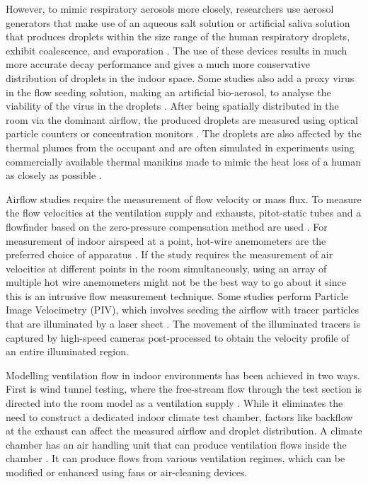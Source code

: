 \documentclass[preprint,12pt]{elsarticle}
\begin{document}
However, to mimic respiratory aerosols more closely, researchers use aerosol generators that make use of an aqueous salt solution or artificial saliva solution that produces droplets within the size range of the human respiratory droplets, exhibit coalescence, and evaporation \cite{zhang2019distribution,zhou2021experimental,jain2023numerical,pan2023predicting}. The use of these devices results in much more accurate decay performance and gives a much more conservative distribution of droplets in the indoor space. Some studies also add a proxy virus in the flow seeding solution, making an artificial bio-aerosol, to analyse the viability of the virus in the droplets \cite{oksanen2022combining}. After being spatially distributed in the room via the dominant airflow, the produced droplets are measured using optical particle counters or concentration monitors \cite{romano2015numerical,duill2021impact,quintero2022reducing}. The droplets are also affected by the thermal plumes from the occupant and are often simulated in experiments using commercially available thermal manikins made to mimic the heat loss of a human as closely as possible \cite{he2011cfd,villafruela2019assessment,li2022airborne,li2023transient}. 

Airflow studies require the measurement of flow velocity or mass flux. To measure the flow velocities at the ventilation supply and exhausts, pitot-static tubes and a flowfinder based on the zero-pressure compensation method are used \cite{li2005role,jiang2009investigating}. For measurement of indoor airspeed at a point, hot-wire anemometers are the preferred choice of apparatus \cite{hang2015potential,qin2023transmission}. If the study requires the measurement of air velocities at different points in the room simultaneously, using an array of multiple hot wire anemometers might not be the best way to go about it since this is an intrusive flow measurement technique. Some studies perform Particle Image Velocimetry (PIV), which involves seeding the airflow with tracer particles that are illuminated by a laser sheet \cite{poussou2010flow,abkarian2020speech,liu2021simulation,faleiros2022tu}. The movement of the illuminated tracers is captured by high-speed cameras post-processed to obtain the velocity profile of an entire illuminated region.

Modelling ventilation flow in indoor environments has been achieved in two ways. First is wind tunnel testing, where the free-stream flow through the test section is directed into the room model as a ventilation supply \cite{motamedi2022cfd}. While it eliminates the need to construct a dedicated indoor climate test chamber, factors like backflow at the exhaust can affect the measured airflow and droplet distribution. A climate chamber has an air handling unit that can produce ventilation flows inside the chamber \cite{berrouk2010experimental,cheng2021experimental,lu2022ventilation,li2023numerical}. It can produce flows from various ventilation regimes, which can be modified or enhanced using fans or air-cleaning devices.
\end{document}
